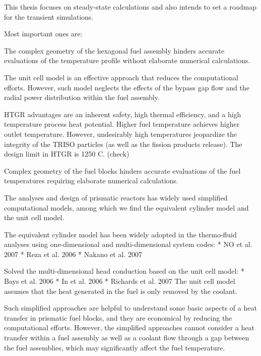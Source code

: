 
This thesis focuses on steady-state calculations and also intends to set a roadmap for the transient simulations.





Most important ones are:



The complex geometry of the hexagonal fuel assembly hinders accurate evaluations of the temperature profile  without elaborate numerical calculations.

The unit cell model is an effective approach that reduces the computational efforts.
However, such model neglects the effects of the bypass gap flow and the radial power distribution within the fuel assembly.

HTGR advantages are an inherent safety, high thermal efficiency, and a high temperature process heat potential.
Higher fuel temperature achieves higher outlet temperature.
However, undesirably high temperatures jeopardize the integrity of the TRISO particles (as well as the fission products release).
The design limit in HTGR is 1250 C. (check)

Complex geometry of the fuel blocks hinders accurate evaluations of the fuel temperatures requiring elaborate numerical calculations.

The analyses and design of prismatic reactors has widely used simplified computational models, among which we find the equivalent cylinder model and the unit cell model.

The equivalent cylinder model has been widely adopted in the thermo-fluid analyses using one-dimensional and multi-dimensional system codes:
* NO et al. 2007 %
* Reza et al. 2006 %
* Nakano et al. 2007 %

Solved the multi-dimensional head conduction based on the unit cell model:
* Bays et al. 2006
* In et al. 2006 %
* Richards et al. 2007 %
The unit cell model assumes that the heat generated in the fuel is only removed by the coolant.

Such simplified approaches are helpful to understand some basic aspects of a heat transfer in prismatic fuel blocks, and they are economical by reducing the computational efforts.
However, the simplified approaches cannot consider a heat transfer within a fuel assembly as well as a coolant flow through a gap between the fuel assemblies, which may significantly affect the fuel temperature.

